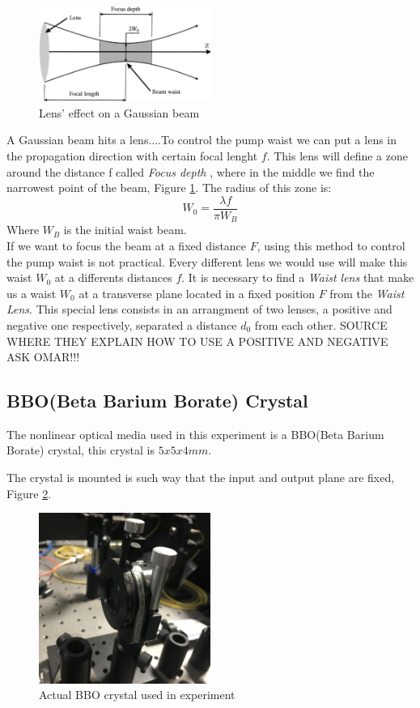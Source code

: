 \begin{figure}
\centering
\includegraphics[width=0.5\textwidth]{Figures/waist.png}
\caption{Lens' effect on a Gaussian beam} 
\label{fig:waist}
\end{figure}
A Gaussian beam hits a lens....To control the pump waist we can put a lens in the propagation direction with certain focal lenght $f$. This lens will define a zone around
the distance f called \textit{Focus depth}\cite{hecht} , where in the middle we find the narrowest point of the beam, Figure \ref{fig:waist}.
The radius of this zone is:
\begin{equation}
 W_0=\frac{\lambda f}{\pi W_B}
\end{equation}
Where $W_B$ is the initial waist beam. 
\\
If we want to focus the beam at a fixed distance $F$, using this method to control the pump waist is not practical. 
Every different lens we would use will make this waist $W_0$ at a differents distances $f$. It is necessary to find a \textit{Waist lens}
that make us a waist $W_0$ at a transverse plane located in a fixed position $F$ from the \textit{Waist Lens}. This
special lens consists in an arrangment of two lenses, a positive and negative one respectively, separated a distance 
$d_0$ from each other.
SOURCE WHERE THEY EXPLAIN HOW TO USE A POSITIVE AND NEGATIVE ASK OMAR!!!


\subsection{BBO(Beta Barium Borate) Crystal}
The nonlinear optical media used in this experiment is a BBO(Beta Barium Borate) crystal, this crystal is $5x5x4 mm$.

The crystal is mounted is such way that the input and output plane are fixed, Figure \ref{fig:bbo}.
\begin{figure}
\centering
\includegraphics[width=0.5\textwidth]{Figures/bbo.jpg}
\caption{Actual BBO crystal used in experiment} 
\label{fig:bbo}
\end{figure}
 



